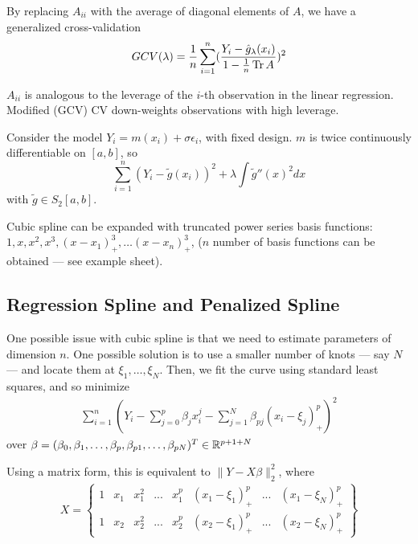 By replacing $A_{ii}$ with the average of diagonal elements of $A$, we
have a generalized cross-validation
\begin{equation}
  \label{eq:81}
  GCV(\lambda) = \frac{1}{n} \sum_{i=1}^{n} (\frac{Y_{i} - \hat
    g_{\lambda}(x_{i})}{1 - \frac{1}{n} \operatorname*{Tr}{A}} )^{2}
\end{equation}

$A_{ii}$ is analogous to the leverage of the $i$-th observation in the
linear regression.  Modified (GCV) CV down-weights observations with
high leverage.

Consider the model $Y_{i} = m(x_{i}) + \sigma \epsilon_{i}$, with
fixed design.  $m$ is twice continuously differentiable on $[a, b]$, so
\begin{equation}
  \label{eq:82}
  \sum_{i=1}^{n} (Y_{i} - \tilde g(x_{i}))^{2} + \lambda \int \tilde
  g''(x)^{2} dx
\end{equation} with $\tilde g \in S_{2}[a, b]$.

Cubic spline can be expanded with truncated power series basis
functions: $1, x, x^{2}, x^{3}, (x - x_{1})^{3}_{+}, \dots (x -
x_{n})^{3}_{+}$, ($n$ number of basis functions can be obtained ---
see example sheet).

\subsection{Regression Spline and Penalized Spline}
\label{sec:regr-spline-penal}

One possible issue with cubic spline is that we need to estimate
parameters of dimension $n$.  One possible solution is to use a
smaller number of knots --- say $N$ --- and locate them at $\xi_{1},
\dots, \xi_{N}$. Then, we fit the curve using standard least squares,
and so minimize
\begin{align}
  \label{eq:83}
  \sum_{i=1}^{n} (Y_{i} - \sum_{j=0}^{p} \beta_{j} x_{i}^{j} -
  \sum_{j=1}^{N} \beta_{pj} (x_{i} - \xi_{j})_{+}^{p})^{2}
\end{align} over $\beta = (\beta_{0}, \beta_{1}, \dots, \beta_{p},
\beta_{p1}, \dots, \beta_{pN})^{T} \in \mathbb{R}^{p + 1 + N}$

Using a matrix form, this is equivalent to $\| Y - X \beta
\|_{2}^{2}$, where
\begin{align}
  \label{eq:84}
  X =
  \begin{Bmatrix}
    1 & x_{1} & x_{1}^{2} & ... & x_{1}^{p} & (x_{1} -
    \xi_{1})_{+}^{p} & ... & (x_{1} - \xi_{N})_{+}^{p} \\
    1 & x_{2} & x_{2}^{2} & ... & x_{2}^{p} & (x_{2} -
    \xi_{1})_{+}^{p} & ... & (x_{2} - \xi_{N})_{+}^{p}
  \end{Bmatrix}
\end{align}

